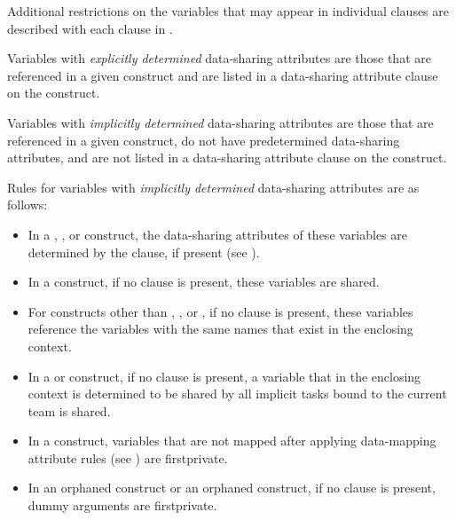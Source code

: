 Additional restrictions on the variables that may appear in individual clauses are 
described with each clause in .

Variables with \emph{explicitly determined} data-sharing attributes are those that are referenced 
in a given construct and are listed in a data-sharing attribute clause on the construct.

Variables with \emph{implicitly determined} data-sharing attributes are those that are referenced 
in a given construct, do not have predetermined data-sharing attributes, and are not 
listed in a data-sharing attribute clause on the construct.

Rules for variables with \emph{implicitly determined} data-sharing attributes are as follows:

\begin{itemize}
\item In a , , or  construct, the data-sharing attributes of these variables are
determined by the  clause, if present (see
).

\item In a  construct, if no  clause is present, these variables are 
shared.

\item For constructs other than , , or , if no  clause is present, these variables reference the variables with the same names that exist in the enclosing context.

\item In a  or  construct, if no  clause is present, a variable that in the 
enclosing context is determined to be shared by all implicit tasks bound to the current 
team is shared.

\item In a  construct, variables that are not mapped after applying data-mapping attribute rules (see ) are firstprivate.
\end{itemize}

\begin{samepage}
\fortranspecificstart
\begin{itemize}
\item In an orphaned  construct or an orphaned  
construct, if no  clause is present, dummy arguments 
are firstprivate.
\end{itemize}
\fortranspecificend
\end{samepage}

